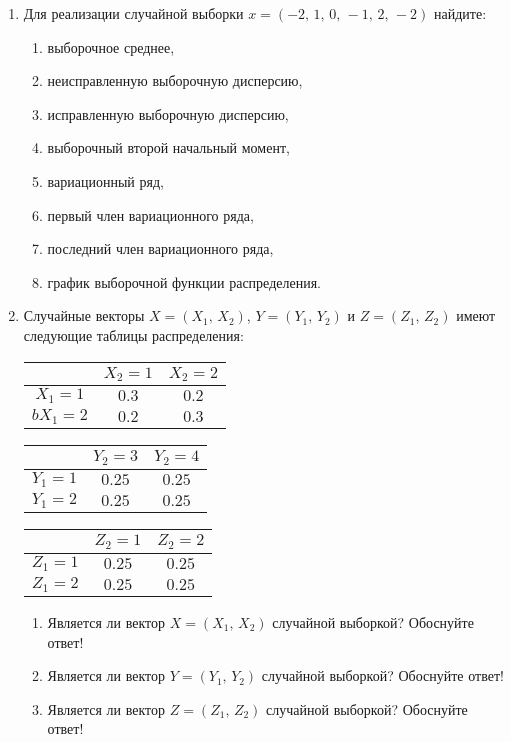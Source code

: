 \begin{enumerate}
  \item  Для реализации случайной выборки $x = (-2, \, 1, \, 0, \, -1, \, 2, \, -2)$ найдите:
\begin{enumerate}
  \item выборочное среднее,
  \item неисправленную выборочную дисперсию,
  \item исправленную выборочную дисперсию,
  \item выборочный второй начальный момент,
  \item вариационный ряд,
  \item первый член вариационного ряда,
  \item последний член вариационного ряда,
  \item график выборочной функции распределения.
\end{enumerate}


\item
Случайные векторы $X = (X_1, \, X_2)$, $Y = (Y_1, \, Y_2)$ и $Z = (Z_1, \, Z_2)$ имеют следующие таблицы распределения:

\begin{tabular}{c|cc}
\toprule
          & $X_2=1$    & $X_2=2$   \\ \midrule
  $X_1=1$   & $0.3$       & $0.2$   \\
  $bX_1=2$   & $0.2$       & $0.3$   \\ \bottomrule
\end{tabular}
\hspace{0.8cm}
\begin{tabular}{c|cc}
\toprule
            & $Y_2=3$     & $Y_2=4$   \\ \midrule
  $Y_1=1$   & $0.25$       & $0.25$   \\
  $Y_1=2$    & $0.25$      & $0.25$   \\ \bottomrule
\end{tabular}
\hspace{0.8cm}
\begin{tabular}{c|cc}
\toprule
           & $Z_2=1$     & $Z_2=2$   \\ \midrule
  $Z_1=1$   & $0.25$       & $0.25$   \\
  $Z_1=2$    & $0.25$      & $0.25$   \\ \bottomrule
\end{tabular}
\begin{enumerate}
  \item Является ли вектор $X = (X_1, \, X_2)$ случайной выборкой? Обоснуйте ответ!
  \item Является ли вектор $Y = (Y_1, \, Y_2)$ случайной выборкой? Обоснуйте ответ!
  \item Является ли вектор $Z = (Z_1, \, Z_2)$ случайной выборкой? Обоснуйте ответ!
\end{enumerate}


\end{enumerate}
